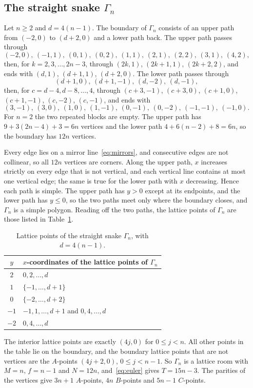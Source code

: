 \documentclass[11pt,a4paper]{article}
\theoremstyle{plain}
\theoremstyle{definition}
\theoremstyle{remark}
\numberwithin{equation}{section}
\begin{document}
\subsection{The straight snake \texorpdfstring{$\Gamma_n$}{Gamma n}}
Let $n\ge2$ and $d=4(n-1)$. The boundary of $\Gamma_n$ consists of an upper path from $(-2,0)$ to $(d+2,0)$ and a lower path back. The upper path passes through
\[
(-2,0),\ (-1,1),\ (0,1),\ (0,2),\ (1,1),\ (2,1),\ (2,2),\ (3,1),\ (4,2),
\]
then, for $k=2,3,\dots,2n-3$, through $(2k,1)$, $(2k+1,1)$, $(2k+2,2)$, and ends with $(d,1)$, $(d+1,1)$, $(d+2,0)$. The lower path passes through
\[
(d+1,0),\ (d+1,-1),\ (d,-2),\ (d,-1),
\]
then, for $c=d-4,d-8,\dots,4$, through $(c+3,-1)$, $(c+3,0)$, $(c+1,0)$, $(c+1,-1)$, $(c,-2)$, $(c,-1)$, and ends with
\[
(3,-1),\ (3,0),\ (1,0),\ (1,-1),\ (0,-1),\ (0,-2),\ (-1,-1),\ (-1,0).
\]
For $n=2$ the two repeated blocks are empty. The upper path has $9+3(2n-4)+3=6n$ vertices and the lower path $4+6(n-2)+8=6n$, so the boundary has $12n$ vertices.

Every edge lies on a mirror line~\eqref{eq:mirrors}, and consecutive edges are not collinear, so all $12n$ vertices are corners. Along the upper path, $x$ increases strictly on every edge that is not vertical, and each vertical line contains at most one vertical edge; the same is true for the lower path with $x$ decreasing. Hence each path is simple. The upper path has $y>0$ except at its endpoints, and the lower path has $y\le0$, so the two paths meet only where the boundary closes, and $\Gamma_n$ is a simple polygon. Reading off the two paths, the lattice points of $\Gamma_n$ are those listed in Table~\ref{tab:straightrows}.

\begin{table}[htbp]
\centering\small
\begin{tabular}{@{}cl@{}}
\toprule
$y$ & $x$-coordinates of the lattice points of $\Gamma_n$\\
\midrule
$2$ & $0,2,\dots,d$\\
$1$ & $\{-1,\dots,d+1\}$\\
$0$ & $\{-2,\dots,d+2\}$\\
$-1$ & $-1,1,\dots,d+1$ and $0,4,\dots,d$\\
$-2$ & $0,4,\dots,d$\\
\bottomrule
\end{tabular}
\caption{Lattice points of the straight snake $\Gamma_n$, with $d=4(n-1)$.}
\label{tab:straightrows}
\end{table}

The interior lattice points are exactly $(4j,0)$ for $0\le j<n$. All other points in the table lie on the boundary, and the boundary lattice points that are not vertices are the $A$-points $(4j+2,0)$, $0\le j<n-1$. So $\Gamma_n$ is a lattice room with $M=n$, $f=n-1$ and $N=12n$, and~\eqref{eq:euler} gives $T=15n-3$. The parities of the vertices give $3n+1$ $A$-points, $4n$ $B$-points and $5n-1$ $C$-points.
\end{document}
